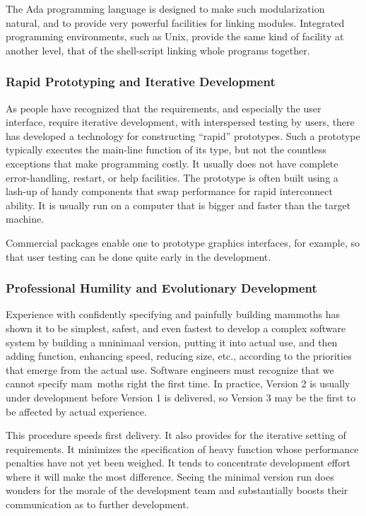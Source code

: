 \documentclass[12pt,final]{article}
\begin{document}
The Ada programming language is designed to make such modularization natural,
and to provide very powerful facilities for linking modules. Integrated
programming environments, such as Unix, provide the same kind of facility at
another level, that of the shell-script linking whole programs together.

\subsubsection*{Rapid Prototyping and Iterative Development}

As people have recognized that the requirements, and especially the user
interface, require iterative development, with interspersed testing by users,
there has developed a technology for constructing “rapid” prototypes. Such a
prototype typically executes the main-line function of its type, but not the
countless exceptions that make programming costly. It usually does not have
complete error-handling, restart, or help facilities. The prototype is often
built using a lash-up of handy components that swap performance for rapid
interconnect ability. It is usually run on a computer that is bigger and faster
than the target machine.

Commercial packages enable one to prototype graphics interfaces, for example,
so that user testing can be done quite early in the development.

\subsubsection*{Professional Humility and Evolutionary Development}

Experience with confidently specifying and painfully building mammoths has
shown it to be simplest, safest, and even fastest to develop a complex software
system by building a mninimaal version, putting it into actual use, and then
adding function, enhancing speed, reducing size, etc., according to the
priorities that emerge from the actual use. Software engineers must recognize
that we cannot specify mam~moths right the first time. In practice, Version 2
is usually under development before Version 1 is delivered, so Version 3 may be
the first to be affected by actual experience.

This procedure speeds first delivery. It also provides for the iterative
setting of requirements. It minimizes the specification of heavy function whose
performance penalties have not yet been weighed. It tends to concentrate
development effort where it will make the most difference. Seeing the minimal
version run does wonders for the morale of the development team and
substantially boosts their communication as to further development.
\end{document}

